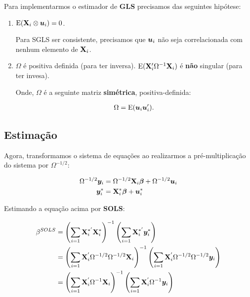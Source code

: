 \documentclass[11pt, oneside, a4paper, article]{article}
\numberwithin{equation}{section}
\begin{document}
\begin{description}
\begin{description}
Para implementarmos o estimador de \textbf{GLS} precisamos das seguintes hipótese:

\begin{enumerate}
\item %

$\text{E}(\mathbf{X}_{i} \otimes \boldsymbol{u}_{i}) = 0$.

Para SGLS ser consistente, precisamos que $\boldsymbol{u}_{i}$ não seja correlacionada com nenhum elemento de $\mathbf{X}_{i}$.

\item %

$\Omega$ é positiva definida (para ter inversa).
$\text{E}(\mathbf{X}_{i}^{\prime} \Omega^{-1} \mathbf{X}_{i})$ é \textbf{não} singular (para ter invesa).

Onde, $\Omega$ é a seguinte matriz \textbf{simétrica}, positiva-definida:

\vspace{-1.5 em}
\begin{align*}
\Omega = \text{E}(\boldsymbol{u}_{i} \boldsymbol{u}_{i}^{\prime}).
\end{align*}
\end{enumerate}

\subsection*{Estimação}

Agora, transformamos o sistema de equações ao realizarmos a pré-multiplicação do sistema por $\Omega^{-1/2}$:

\vspace{-1.5 em}
\begin{align*}
\Omega^{-1/2} \boldsymbol{y}_{i} 
&=
\Omega^{-1/2} \mathbf{X}_{i} \boldsymbol{\beta}
+
\Omega^{-1/2} \boldsymbol{u}_{i}
\\
\boldsymbol{y}_{i}^{*}
&=
\mathbf{X}_{i}^{*} \boldsymbol{\beta}
+
\boldsymbol{u}^{*}_{i}
\end{align*}

Estimando a equação acima por \textbf{SOLS}:

\vspace{-1.5 em}
\begin{align*}
\beta^{SOLS}
&=
\left( \sum_{i=1} \mathbf{X}_{i}^{*'} \mathbf{X}_{i}^{*} \right)^{-1}
\left( \sum_{i=1} \mathbf{X}_{i}^{*'} \boldsymbol{y}_{i}^{*} \right)
\\
&=
\left( \sum_{i=1} \mathbf{X}_{i}^{'} \Omega^{-1/2} \Omega^{-1/2} \mathbf{X}_{i} \right)^{-1}
\left( \sum_{i=1} \mathbf{X}_{i}^{'} \Omega^{-1/2} \Omega^{-1/2} \boldsymbol{y}_{i} \right)
\\
&=
\left( \sum_{i=1} \mathbf{X}_{i}^{'} \Omega^{-1} \mathbf{X}_{i} \right)^{-1}
\left( \sum_{i=1} \mathbf{X}_{i}^{'} \Omega^{-1} \boldsymbol{y}_{i} \right)
\end{align*}



\end{description}
\end{description}
\end{document}
